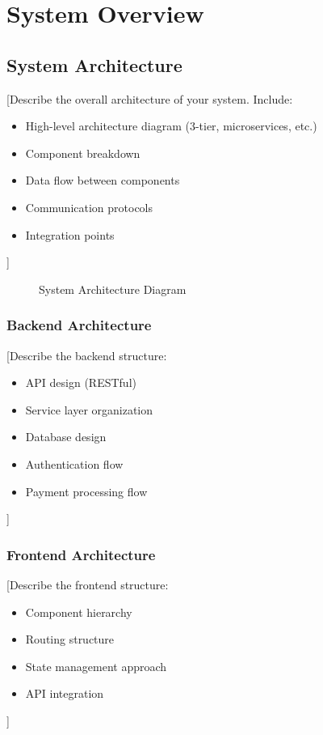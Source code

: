 \documentclass[a4paper,12pt]{report}
\begin{document}
\chapter{System Overview}

\section{System Architecture}

[Describe the overall architecture of your system. Include:
\begin{itemize}
    \item High-level architecture diagram (3-tier, microservices, etc.)
    \item Component breakdown
    \item Data flow between components
    \item Communication protocols
    \item Integration points
\end{itemize}]

\begin{figure}[h]
    \centering
    \caption{System Architecture Diagram}
    \label{fig:architecture}
\end{figure}

\subsection{Backend Architecture}

[Describe the backend structure:
\begin{itemize}
    \item API design (RESTful)
    \item Service layer organization
    \item Database design
    \item Authentication flow
    \item Payment processing flow
\end{itemize}]

\subsection{Frontend Architecture}

[Describe the frontend structure:
\begin{itemize}
    \item Component hierarchy
    \item Routing structure
    \item State management approach
    \item API integration
\end{itemize}]
\end{document}
